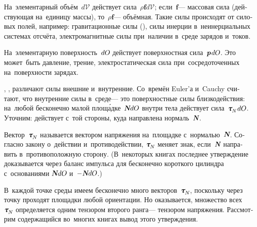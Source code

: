 \begin{otherlanguage}{russian}

На~элементарный объём~$d\mathcal{V}$ действует сила~${\rho \bm{f} d\mathcal{V}}$; \hbox{если}~$\bm{f}$\:--- массовая сила (действующая на~единицу массы), то~${\rho \bm{f}}$\:--- объёмная. Такие силы происходят от силовых полей, например: гравитационные силы (), силы инерции в~неинерциальных системах отсчёта, электромагнитные силы при~наличии в~среде зарядов и~токов.

На~элементарную поверхность~${dO\hspace{-0.12ex}}$ действует поверхностная сила~${\bm{p} \hspace{0.2ex} dO\hspace{-0.12ex}}$. Это может~быть давление, трение, электростатическая сила при~сосредоточенных на~поверхности зарядах.

, , различают силы внешние и~внутренние. Со~времён Euler’а и~Cauchy считают, что внутренние силы в~среде\:--- это поверхностные силы близкодействия: на~любой бесконечно малой площ\'{а}дке~${\mathboldN dO\hspace{-0.12ex}}$ внутри тела действует сила~${\cauchystress_{\hspace{-0.2ex}\raisemath{-0.1em}{N}\hspace{0.1ex}} dO\hspace{-0.12ex}}$. Уточним: действует с~той стороны, куда направлена нормаль~$\mathboldN$.

Вектор~${\cauchystress_{\hspace{-0.2ex}\raisemath{-0.1em}{N}}\hspace{-0.1ex}}$ называется вектором напряжения на~площадке с~нормалью~$\mathboldN$. Согласно закону о~действии и~противодействии, ${\cauchystress_{\hspace{-0.2ex}\raisemath{-0.1em}{N}}\hspace{-0.1ex}}$ меняет знак, если~$\mathboldN$ направить в~противоположную сторону.
(В~некоторых книгах последнее утверждение доказывается через баланс импульса для бесконечно короткого цилиндра с~основаниями ${\mathboldN dO\hspace{-0.12ex}}$ и~${- \hspace{0.1ex} \mathboldN dO\hspace{-0.12ex}}$.)

В~каждой точке среды имеем бесконечно много векторов~${\cauchystress_{\hspace{-0.2ex}\raisemath{-0.1em}{N}}\hspace{-0.1ex}}$, поскольку через точку проходят площадки любой ориентации. Но оказывается, множество всех~${\cauchystress_{\hspace{-0.2ex}\raisemath{-0.1em}{N}}\hspace{-0.1ex}}$ определяется одним тензором второго ранга\:--- тензором напряжения. Рассмотрим содержащийся во~многих книгах вывод этого утверждения.


\end{otherlanguage}
